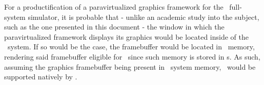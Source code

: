 For a productification of a paravirtualized graphics framework for the \dvttermsimics\ full-system simulator, it is probable that - unlike an academic study into the subject, such as the one presented in this document - the window in which the paravirtualized framework displays its graphics would be located inside of the \dvttermtarget\ system.
If so would be the case, the framebuffer would be located in \dvttermtarget\ memory, rendering said framebuffer eligible for \dvttermreverseexecution\ since such memory is stored in \dvttermcheckpoint s.
As such, assuming the graphics framebuffer being present in \dvttermtarget\ system memory, \dvttermreverseexecution\ would be supported natively by \dvttermsimics .